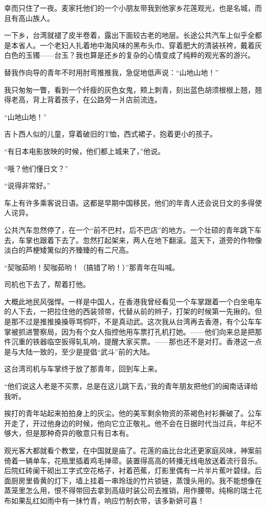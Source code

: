 \par 幸而只住了一夜。麦家托他们的一个小朋友带我到他家乡花莲观光，也是名城，而且有高山族人。
\par 一下乡，台湾就褪了皮半卷着，露出下面较古老的地层。长途公共汽车上似乎全都是本省人。一个老妇人扎着地中海风味的黑布头巾、穿着肥大的清装袄袴，戴着灰白色的玉镯——台玉？我也算是还乡的复杂的心情变成了纯粹的观光客的游兴。
\par 替我作向导的青年不时用肘弯推推我，急促地低声说：“山地山地！”
\par 我只匆匆一瞥，看到一个纤瘦的灰色女鬼，颊上刺青，刻出蓝色胡须根根上翘，翘得老高，背上背着孩子，在公路旁一爿店前流连。
\par “山地山地！”
\par 吉卜西人似的儿童，穿着破旧的T恤，西式裙子，抱着更小的孩子。
\par “有日本电影放映的时候，他们都上城来了，”他说。
\par “哦？他们懂日文？”
\par “说得非常好。”
\par 车上有许多乘客说日语。这都是早期中国移民，他们的年青人还会说日文的多得使人诧异。
\par 公共汽车忽然停了，在一个“前不巴村，后不巴店”的地方。一个壮硕的青年跳下车去，车掌也跟着下去了。忽然打起架来，两人在地下翻滚。蓝天下，道旁的作物像淡白的芦梗矮篱似的齐臻臻的有二尺高。
\par “契咖茹哟！契咖茹哟！（搞错了哟！）”那青年在叫喊。
\par 司机也下去了，帮着打他。
\par 大概此地民风强悍。一样是中国人，在香港我曾经看见一个车掌跟着一个白坐电车的人下去，一把拉住他的西装领带，代替从前的辫子，打架的时候第一先揪的。但是那不过是推推搡搡辱骂恫吓，不是真动武。这次我从台湾再去香港，有个公车车掌被抓进警察局，因为有个女人指控他用车票打孔机打她。——他们向来总是把那件沉重的铁器临空扳得轧轧响，提醒大家买票。——那也还不是对打。香港这一点是与大陆一致的，至少是提倡“武斗”前的大陆。
\par 这台湾司机与车掌终于放了那青年，回到车上来。
\par “他们说这人老是不买票，总是在这儿跳下去，”我的青年朋友把他们的闽南话译给我听。
\par 挨打的青年站起来拍拍身上的灰尘。他的美军剩余物资的茶褐色衬衫撕破了。公车开走了，开过他身边的时候，他向它立正敬礼。他不会在日据时代当过兵，年纪不够大，但是那种奇异的敬意只有日本有。
\par 观光客大都就看个教堂，在中国就是庙了。花莲的庙比台北还更家庭风味，神案前倚着一辆单车，花瓶里插着鸡毛掸帚。装置得高高的转播无线电放送着流行音乐。后院红砖阑干砌出工字式空花格子，衬着芭蕉，灯影里偶有一片半片蕉叶碧绿。后面厨房里昏黄的灯下，墙上挂着一串玲珑的竹片锁链，蒸馒头用的。我不能想像在蒸笼里怎么用，恨不得带回去拿到高级时装公司去推销，用作腰带。纯棉的瑞士花布如果乱红如雨中有一抹竹青，响应竹制衣带，该多新妍可喜！
